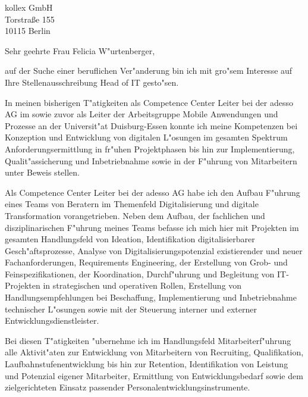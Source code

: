 \documentclass[10pt,a4paper]{dinbrief}
\date{\today}
\begin{document}
 
\begin{letter}  
{%
	kollex GmbH\\
	Torstraße 155\\
	10115 Berlin
}
\subject{\bf Bewerbung Head of IT}
\opening{Sehr geehrte Frau Felicia W"urtenberger,}
auf der Suche einer beruflichen Ver"anderung bin ich mit gro"sem Interesse auf Ihre Stellenausschreibung Head of IT gesto"sen. 

In meinen bisherigen T"atigkeiten als Competence Center Leiter bei der adesso AG im sowie zuvor als Leiter der Arbeitsgruppe Mobile Anwendungen und Prozesse an der Universit"at Duisburg-Essen konnte ich meine Kompetenzen bei Konzeption und Entwicklung von digitalen L"osungen im gesamten Spektrum Anforderungsermittlung in fr"uhen Projektphasen bis hin zur Implementierung, Qualit"assicherung und Inbetriebnahme sowie in der F"uhrung von Mitarbeitern unter Beweis stellen.


Als Competence Center Leiter bei der adesso AG habe ich den Aufbau F"uhrung eines Teams von Beratern im Themenfeld Digitalisierung und digitale Transformation vorangetrieben. Neben dem Aufbau, der fachlichen und disziplinarischen F"uhrung meines Teams befasse ich mich hier mit Projekten im gesamten Handlungsfeld von Ideation, Identifikation digitalisierbarer Gesch"aftsprozesse, Analyse von Digitalisierungspotenzial existierender und neuer Fachanforderungen, Requirements Engineering, der Erstellung von Grob- und Feinspezifikationen, der Koordination, Durchf"uhrung und Begleitung von IT-Projekten in strategischen und operativen Rollen, Erstellung von Handlungsempfehlungen bei Beschaffung, Implementierung und Inbetriebnahme technischer L"osungen sowie mit der Steuerung interner und externer Entwicklungsdienstleister. 

Bei diesen T"atigkeiten "ubernehme ich im Handlungsfeld Mitarbeiterf"uhrung alle Aktivit"aten zur Entwicklung von Mitarbeitern von Recruiting, Qualifikation, Laufbahnstufenentwicklung bis hin zur Retention, Identifikation von Leistung und Potenzial eigener Mitarbeiter, Ermittlung von Entwicklungsbedarf sowie dem zielgerichteten Einsatz passender Personalentwicklungsinstrumente.


\end{letter}
\end{document}
